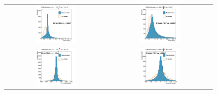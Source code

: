 \begin{figure}[!htb]
  \begin{center}
    \begin{tabular}{cc}
      \includegraphics[width=0.4\textwidth]{evtsel/figs/EoPout_EB_LowPt.pdf} &
      \includegraphics[width=0.4\textwidth]{evtsel/figs/EoPout_EE_LowPt.pdf} \\      
      \includegraphics[width=0.4\textwidth]{evtsel/figs/deltaEta_EB_LowPt.pdf} &
      \includegraphics[width=0.4\textwidth]{evtsel/figs/deltaEta_EE_LowPt.pdf} \\      

\end{tabular}
\end{center}
\end{figure}
